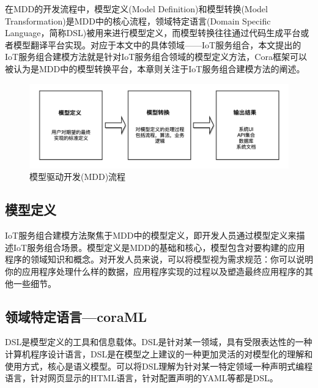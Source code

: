 \documentclass[winfonts,master,twoside]{njuthesis}
\begin{document}
在MDD的开发流程中，模型定义(Model Definition)和模型转换(Model Transformation)是MDD中的核心流程，领域特定语言(Domain Specific Language，简称DSL)\cite{van2000domain}被用来进行模型定义，而模型转换往往通过代码生成平台或者模型翻译平台实现。对应于本文中的具体领域——IoT服务组合，本文提出的IoT服务组合建模方法就是针对IoT服务组合领域的模型定义方法，Cora框架可以被认为是MDD中的模型转换平台，本章则关注于IoT服务组合建模方法的阐述。

\begin{figure}
	\centering
	\includegraphics[width=1.0\textwidth]{figure/3-model-driven/MDD.png}
	\caption{模型驱动开发(MDD)流程}
	\label{ontransact-impl}
\end{figure}

\subsection{模型定义}
IoT服务组合建模方法聚焦于MDD中的模型定义，即开发人员通过模型定义来描述IoT服务组合场景。模型定义是MDD的基础和核心，模型包含对要构建的应用程序的领域知识和概念\cite{dsl}。对开发人员来说，可以将模型视为需求规范：你可以说明你的应用程序处理什么样的数据，应用程序实现的过程以及塑造最终应用程序的其他一些细节。

\subsection{领域特定语言—coraML}
DSL是模型定义的工具和信息载体。DSL是针对某一领域，具有受限表达性的一种计算机程序设计语言，DSL是在模型之上建议的一种更加灵活的对模型化的理解和使用方式，核心是语义模型。可以将DSL理解为针对某一特定领域一种声明式编程语言，针对网页显示的HTML语言，针对配置声明的YAML等都是DSL。

\end{document}
